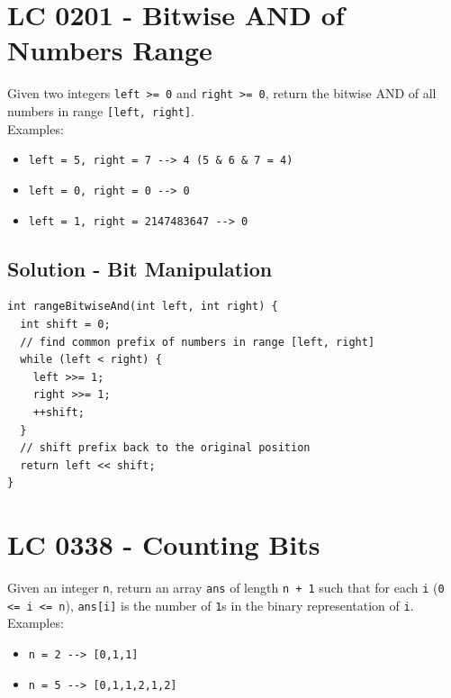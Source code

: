 \section{LC 0201 - Bitwise AND of Numbers Range}
Given two integers {\colorbox{CodeBackground}{\lstinline|left >= 0|}} and {\colorbox{CodeBackground}{\lstinline|right >= 0|}}, return the bitwise AND of all numbers in range {\colorbox{CodeBackground}{\lstinline|[left, right]|}}.\\

Examples:
\begin{itemize}
\item {\colorbox{CodeBackground}{\lstinline|left = 5, right = 7 --> 4 (5 & 6 & 7 = 4)|}}
\item {\colorbox{CodeBackground}{\lstinline|left = 0, right = 0 --> 0|}}
\item {\colorbox{CodeBackground}{\lstinline|left = 1, right = 2147483647 --> 0|}}
\end{itemize}

\subsection*{Solution - Bit Manipulation}
\begin{lstlisting}
int rangeBitwiseAnd(int left, int right) {
  int shift = 0;
  // find common prefix of numbers in range [left, right]
  while (left < right) {
    left >>= 1;
    right >>= 1;
    ++shift;
  }
  // shift prefix back to the original position
  return left << shift;
}
\end{lstlisting}

\section{LC 0338 - Counting Bits}
Given an integer {\colorbox{CodeBackground}{\lstinline|n|}}, return an array {\colorbox{CodeBackground}{\lstinline|ans|}} of length {\colorbox{CodeBackground}{\lstinline|n + 1|}} such that for each {\colorbox{CodeBackground}{\lstinline|i|}} ({\colorbox{CodeBackground}{\lstinline|0 <= i <= n|}}), {\colorbox{CodeBackground}{\lstinline|ans[i]|}} is the number of {\colorbox{CodeBackground}{\lstinline|1|}}s in the binary representation of {\colorbox{CodeBackground}{\lstinline|i|}}.\\

Examples:
\begin{itemize}
\item {\colorbox{CodeBackground}{\lstinline|n = 2 --> [0,1,1]|}}
\item {\colorbox{CodeBackground}{\lstinline|n = 5 --> [0,1,1,2,1,2]|}}
\end{itemize}

